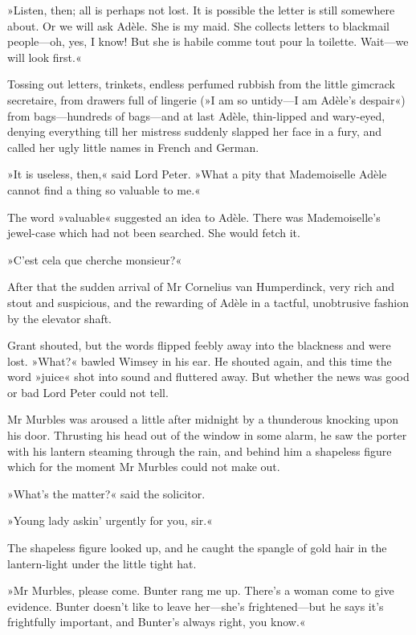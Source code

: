»Listen, then; all is perhaps not lost. It is possible the letter is still somewhere about. Or we will ask Adèle. She is my maid. She collects letters to blackmail people\allowbreak---\allowbreak oh, yes, I know! But she is habile comme tout pour la toilette. Wait\allowbreak---\allowbreak we will look first.«

Tossing out letters, trinkets, endless perfumed rubbish from the little gimcrack secretaire, from drawers full of lingerie (»I am so untidy\allowbreak---\allowbreak I am Adèle's despair«) from bags\allowbreak---\allowbreak hundreds of bags\allowbreak---\allowbreak and at last Adèle, thin-lipped and wary-eyed, denying everything till her mistress suddenly slapped her face in a fury, and called her ugly little names in French and German.

»It is useless, then,« said Lord Peter. »What a pity that Mademoiselle Adèle cannot find a thing so valuable to me.«

The word »valuable« suggested an idea to Adèle. There was Mademoiselle's jewel-case which had not been searched. She would fetch it.

»C'est cela que cherche monsieur?«

After that the sudden arrival of Mr Cornelius van Humperdinck, very rich and stout and suspicious, and the rewarding of Adèle in a tactful, unobtrusive fashion by the elevator shaft.

Grant shouted, but the words flipped feebly away into the blackness and were lost. »What?« bawled Wimsey in his ear. He shouted again, and this time the word »juice« shot into sound and fluttered away. But whether the news was good or bad Lord Peter could not tell.

Mr Murbles was aroused a little after midnight by a thunderous knocking upon his door. Thrusting his head out of the window in some alarm, he saw the porter with his lantern steaming through the rain, and behind him a shapeless figure which for the moment Mr Murbles could not make out.

»What's the matter?« said the solicitor.

»Young lady askin' urgently for you, sir.«

The shapeless figure looked up, and he caught the spangle of gold hair in the lantern-light under the little tight hat.

»Mr Murbles, please come. Bunter rang me up. There's a woman come to give evidence. Bunter doesn't like to leave her\allowbreak---\allowbreak she's frightened\allowbreak---\allowbreak but he says it's frightfully important, and Bunter's always right, you know.«

